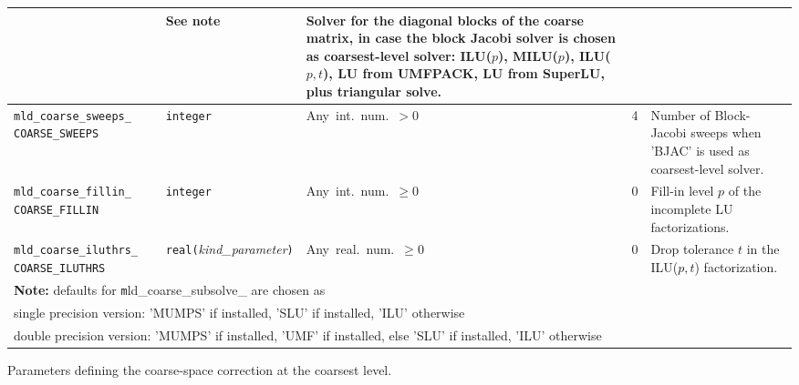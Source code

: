 \begin{center}
\begin{tabular}{|p{3.5cm}|l|p{3.2cm}|l|p{5cm}|}
                         & See note
                         & Solver for the diagonal blocks of the coarse matrix,
                           in case the block Jacobi solver
                           is chosen as coarsest-level solver: ILU($p$), MILU($p$),
                           ILU($p,t$), LU from UMFPACK,
                           LU from SuperLU, plus triangular solve. \\ \hline
\verb|mld_coarse_sweeps_| \break \verb|COARSE_SWEEPS| & \verb|integer|                         
                         & Any~int.~num.~$> 0$
                         & 4
                         & Number of Block-Jacobi sweeps when 'BJAC' is used as
                           coarsest-level solver. \\ \hline
\verb|mld_coarse_fillin_| \break \verb|COARSE_FILLIN| & \verb|integer|
                         & Any~int.~num.~$\ge 0$
                         & 0
                         & Fill-in level $p$ of the incomplete LU factorizations. \\ \hline
\verb|mld_coarse_iluthrs_|  \break \verb|COARSE_ILUTHRS| & \verb|real(|\emph{kind\_parameter}\verb|)|
                         & Any~real.~num.~$\ge 0$
                         & 0
                         & Drop tolerance $t$ in the ILU($p,t$) factorization. \\
\hline
\multicolumn{5}{|l|}{{\bfseries Note:} defaults for
  {\texttt mld\_coarse\_subsolve\_} are chosen as }\\ 
\multicolumn{5}{|l|}{single precision version: 'MUMPS' if installed, 'SLU' if installed, 'ILU' otherwise}\\
\multicolumn{5}{|l|}{double precision version: 'MUMPS' if installed, 'UMF' if installed,
  else 'SLU' if installed, 'ILU' otherwise}\\
\hline
\end{tabular}
\end{center}
\caption{Parameters defining the coarse-space correction at the coarsest
level.\label{tab:p_coarse}} 
\esideways



